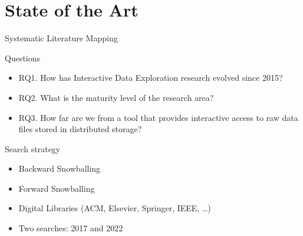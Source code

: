 \documentclass[10pt,compress]{beamer}
\begin{document}
\section{State of the Art}
\begin{frame}{Systematic Literature Mapping}
\begin{alertblock}{Questions}
    \begin{itemize}
        \item RQ1. How has Interactive Data Exploration research evolved since 2015?
        \item RQ2. What is the maturity level of the research area?
        \item RQ3. How far are we from a tool that provides \alert{interactive} access
            to \alert{raw} data files stored in \alert{distributed} storage?
    \end{itemize}
\end{alertblock}
\begin{block}{Search strategy}
    \begin{itemize}
        \item Backward Snowballing \cite{Idreos2015}
        \item Forward Snowballing
        \item Digital Libraries (ACM, Elsevier, Springer, IEEE, \ldots)
        \item Two searches: 2017 and 2022
    \end{itemize}
\end{block}
\end{frame}
\end{document}
